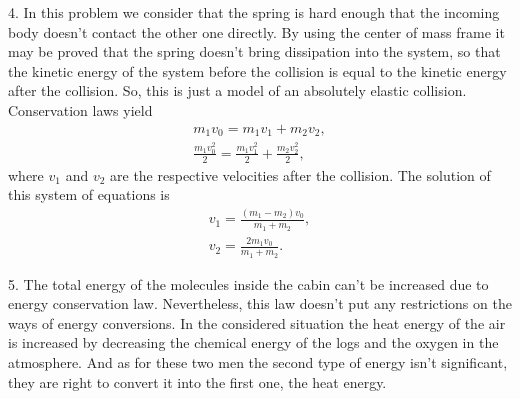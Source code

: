 \documentclass[12pt,a4paper,pdflatex]{disser}
\begin{document}
4. In this problem we consider that the spring is hard enough that the incoming body doesn't contact the other one directly. By using the center of mass frame it may be proved that the spring doesn't bring dissipation into the system, so that the kinetic energy of the system before the collision is equal to the kinetic energy after the collision. So, this is just a model of an absolutely elastic collision. Conservation laws yield
\begin{gather}
  m_1 v_0=m_1 v_1+m_2 v_2,\nonumber\\
  \frac{m_1 v_0^2}{2}=\frac{m_1 v_1^2}{2}+\frac{m_2 v_2^2}{2},\nonumber
\end{gather}
where $v_1$ and $v_2$ are the respective velocities after the collision. The solution of this system of equations is
\begin{gather}
  v_1=\frac{\left(m_1-m_2\right)v_0}{m_1+m_2},\nonumber\\
  v_2=\frac{2m_1 v_0}{m_1+m_2}.\nonumber
\end{gather}

5. The total energy of the molecules inside the cabin can't be increased due to energy conservation law. Nevertheless, this law doesn't put any restrictions on the ways of energy conversions. In the considered situation the heat energy of the air is increased by decreasing the chemical energy of the logs and the oxygen in the atmosphere. And as for these two men the second type of energy isn't significant, they are right to convert it into the first one, the heat energy.
\end{document}

